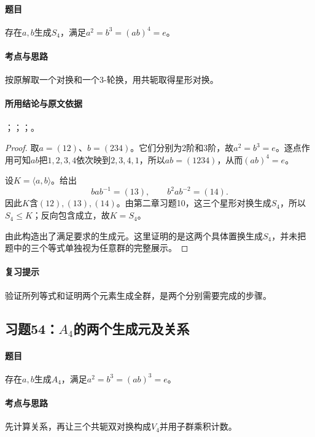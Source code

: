 \paragraph{题目}
存在$a,b$生成$S_4$，满足$a^2=b^3=(ab)^4=e$。

\paragraph{考点与思路}
按原解取一个对换和一个3-轮换，用共轭取得星形对换。

\paragraph{所用结论与原文依据}
；；；。


\begin{proof}
取$a=(12)$、$b=(234)$。它们分别为2阶和3阶，故$a^2=b^3=e$。逐点作用可知$ab$把$1,2,3,4$依次映到$2,3,4,1$，所以$ab=(1234)$，从而$(ab)^4=e$。

设$K=\langle a,b\rangle$。给出
\[
bab^{-1}=(13),\qquad b^2ab^{-2}=(14).
\]
因此$K$含$(12),(13),(14)$。由第二章习题10，这三个星形对换生成$S_4$，所以$S_4\leq K$；反向包含成立，故$K=S_4$。

由此构造出了满足要求的生成元。这里证明的是这两个具体置换生成$S_4$，并未把题中的三个等式单独视为任意群的完整展示。
\end{proof}

\paragraph{复习提示}
验证所列等式和证明两个元素生成全群，是两个分别需要完成的步骤。


\subsection{习题54：\texorpdfstring{$A_4$的两个生成元及关系}{A4的两个生成元及关系}}
\label{ex:2:54}

\paragraph{题目}
存在$a,b$生成$A_4$，满足$a^2=b^3=(ab)^3=e$。

\paragraph{考点与思路}
先计算关系，再让三个共轭双对换构成$V_4$并用子群乘积计数。

